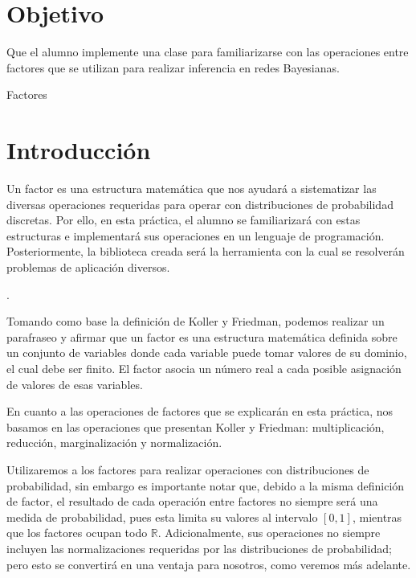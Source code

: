 \section{Objetivo}

Que el alumno implemente una clase  para familiarizarse con las operaciones entre factores que se utilizan para realizar inferencia en redes Bayesianas.


\begin{auxcode}
 \caption{Factores}
 \centering
\end{auxcode}

\section{Introducción}

Un factor es una estructura matemática que nos ayudará a sistematizar las diversas operaciones requeridas para operar con distribuciones de probabilidad discretas.  Por ello, en esta práctica, el alumno se familiarizará con estas estructuras e implementará sus operaciones en un lenguaje de programación.  Posteriormente, la biblioteca creada será la herramienta con la cual se resolverán problemas de aplicación diversos.

\begin{definition}[Factor]
 
 \parencite[104]{KollerFriedman2009}.
\end{definition}

Tomando como base la definición de Koller y Friedman, podemos realizar un parafraseo y afirmar que un factor es una estructura matemática definida sobre un conjunto de variables donde cada variable puede tomar valores de su dominio, el cual debe ser finito. El factor asocia un número real a cada posible asignación de valores de esas variables.

En cuanto a las operaciones de factores que se explicarán en esta práctica, nos basamos en las operaciones que presentan Koller y Friedman: multiplicación, reducción, marginalización y normalización.

Utilizaremos a los factores para realizar operaciones con distribuciones de probabilidad, sin embargo es importante notar que, debido a la misma definición de factor, el resultado de cada operación entre factores no siempre será una medida de probabilidad, pues esta limita su valores al intervalo $[0,1]$, mientras que los factores ocupan todo \(\mathbb{R}\).  Adicionalmente, sus operaciones no siempre incluyen las normalizaciones requeridas por las distribuciones de probabilidad; pero esto se convertirá en una ventaja para nosotros, como veremos más adelante.

